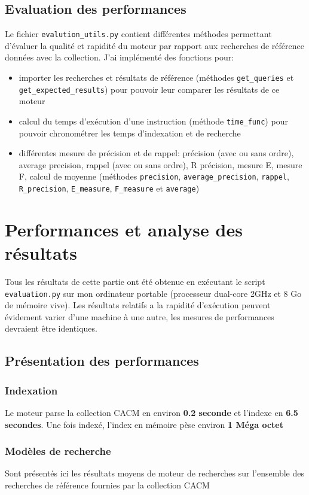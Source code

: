 \documentclass{article}
\begin{document}
\subsection{Evaluation des performances}
Le fichier \texttt{evalution\_utils.py} contient différentes méthodes permettant d’évaluer la qualité et rapidité du moteur par rapport aux recherches de référence données avec la collection. J'ai implémenté des fonctions pour:
\begin{itemize}
\item importer les recherches et résultats de référence (méthodes \texttt{get\_queries} et \texttt{get\_expected\_results}) pour pouvoir leur comparer les résultats de ce moteur
\item calcul du temps d’exécution d'une instruction (méthode \texttt{time\_func}) pour pouvoir chronométrer les temps d'indexation et de recherche
\item différentes mesure de précision et de rappel: précision (avec ou sans ordre), average precision, rappel (avec ou sans ordre), R précision, mesure E, mesure F, calcul de moyenne (méthodes \texttt{precision}, \texttt{average\_precision}, \texttt{rappel}, \texttt{R\_precision}, \texttt{E\_measure}, \texttt{F\_measure} et \texttt{average})
\end{itemize}

\section{Performances et analyse des résultats}
Tous les résultats de cette partie ont été obtenue en exécutant le script \texttt{evaluation.py} sur mon ordinateur portable (processeur dual-core 2GHz et 8 Go de mémoire vive). Les résultats relatifs a la rapidité d’exécution peuvent évidement varier d'une machine à une autre, les mesures de performances devraient être identiques.

\subsection{Présentation des performances}
\subsubsection*{Indexation}
Le moteur parse la collection CACM en environ \textbf{0.2 seconde} et l'indexe en \textbf{6.5 secondes}. Une fois indexé, l'index en mémoire pèse environ \textbf{1 Méga octet}

\subsubsection*{Modèles de recherche}
Sont présentés ici les résultats moyens de moteur de recherches sur l'ensemble des recherches de référence fournies par la collection CACM
\end{document}
